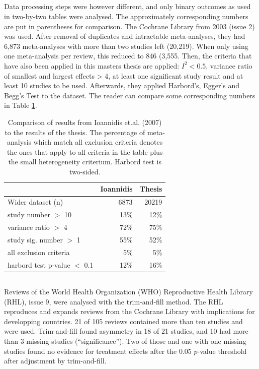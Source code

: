 \documentclass[11pt,a4paper,twoside]{book}\usepackage[]{graphicx}\usepackage[]{color}
\begin{document}
\subsection{\citet{Ioannidis2007}}
Data processing steps were however different, and only binary outcomes as used in two-by-two tables were analysed. The approximately corresponding numbers are put in parentheses for comparison. The Cochrane Library from 2003 (issue 2) was used. After removal of duplicates and intractable meta-analyses, they had 6,873 meta-analyses with more than two studies left (20,219). When only using one meta-analysis per review, this reduced to 846 (3,555. Then, the criteria that have also been applied in this masters thesis are applied: $I^2 < 0.5$, variance ratio of smallest and largest effects > 4, at least one significant study result and at least 10 studies to be used. Afterwards, they applied Harbord's, Egger's and Begg's Test to the dataset. The reader can compare some corresponding numbers in Table \ref{ioannidis}.

\begin{table}[ht]
\centering
\begin{tabular}{lrr}
  \hline
 & Ioannidis & Thesis \\ 
  \hline
Wider dataset (n) & 6873 & 20219 \\ 
  study number $>$ 10 & 13\% & 12\% \\ 
  variance ratio $>$ 4 & 72\% & 75\% \\ 
  study sig. number $>$ 1 & 55\% & 52\% \\ 
  all exclusion criteria & 5\% & 5\% \\ 
  harbord test p-value $<$ 0.1 & 12\% & 16\% \\ 
   \hline
\end{tabular}
\caption{Comparison of results from Ioannidis et.al. (2007) to the results of the thesis. The percentage of meta-analysis which match all exclusion criteria denotes the ones that apply to all criteria in the table plus the small heterogeneity criterium. Harbord test is two-sided.} 
\label{ioannidis}
\end{table}


\subsection{\citet{souza.2007}}
Reviews of the World Health Organization (WHO) Reproductive Health Library (RHL), issue 9, were analysed with the trim-and-fill method. The RHL reproduces and expands reviews from the Cochrane Library with implications for developping countries. 21 of 105 reviews contained more than ten studies and were used. Trim-and-fill found asymmetry in 18 of 21 studies, and 10 had more than 3 missing studies (``significance''). Two of those and one with one missing studies found no evidence for treatment effects after the 0.05 $p$-value threshold after adjustment by trim-and-fill.
\end{document}
